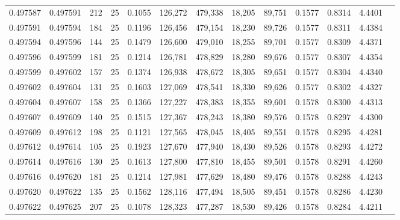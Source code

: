 \begin{tabular}{rrrrrrrrrrrrr}
0.497587 & 0.497591 & 212 &  25 &                                     0.1055 & 126,272 & 479,338 &  18,205 &  89,751 & 0.1577 & 0.8314 & 4.4401 \\
0.497591 & 0.497594 & 184 &  25 &                                     0.1196 & 126,456 & 479,154 &  18,230 &  89,726 & 0.1577 & 0.8311 & 4.4384 \\
0.497594 & 0.497596 & 144 &  25 &                                     0.1479 & 126,600 & 479,010 &  18,255 &  89,701 & 0.1577 & 0.8309 & 4.4371 \\
0.497596 & 0.497599 & 181 &  25 &                                     0.1214 & 126,781 & 478,829 &  18,280 &  89,676 & 0.1577 & 0.8307 & 4.4354 \\
0.497599 & 0.497602 & 157 &  25 &                                     0.1374 & 126,938 & 478,672 &  18,305 &  89,651 & 0.1577 & 0.8304 & 4.4340 \\
0.497602 & 0.497604 & 131 &  25 &                                     0.1603 & 127,069 & 478,541 &  18,330 &  89,626 & 0.1577 & 0.8302 & 4.4327 \\
0.497604 & 0.497607 & 158 &  25 &                                     0.1366 & 127,227 & 478,383 &  18,355 &  89,601 & 0.1578 & 0.8300 & 4.4313 \\
0.497607 & 0.497609 & 140 &  25 &                                     0.1515 & 127,367 & 478,243 &  18,380 &  89,576 & 0.1578 & 0.8297 & 4.4300 \\
0.497609 & 0.497612 & 198 &  25 &                                     0.1121 & 127,565 & 478,045 &  18,405 &  89,551 & 0.1578 & 0.8295 & 4.4281 \\
0.497612 & 0.497614 & 105 &  25 &                                     0.1923 & 127,670 & 477,940 &  18,430 &  89,526 & 0.1578 & 0.8293 & 4.4272 \\
0.497614 & 0.497616 & 130 &  25 &                                     0.1613 & 127,800 & 477,810 &  18,455 &  89,501 & 0.1578 & 0.8291 & 4.4260 \\
0.497616 & 0.497620 & 181 &  25 &                                     0.1214 & 127,981 & 477,629 &  18,480 &  89,476 & 0.1578 & 0.8288 & 4.4243 \\
0.497620 & 0.497622 & 135 &  25 &                                     0.1562 & 128,116 & 477,494 &  18,505 &  89,451 & 0.1578 & 0.8286 & 4.4230 \\
0.497622 & 0.497625 & 207 &  25 &                                     0.1078 & 128,323 & 477,287 &  18,530 &  89,426 & 0.1578 & 0.8284 & 4.4211 \\

\end{tabular}
